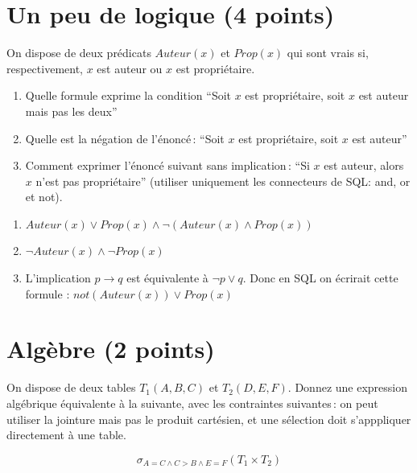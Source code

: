 \section{Un peu de logique (4 points)}

On dispose de deux prédicats $Auteur(x)$ et $Prop(x)$ qui sont vrais si,
respectivement, $x$ est auteur ou $x$ est propriétaire.

\begin{enumerate}
  \item Quelle formule exprime la condition ``Soit $x$  est propriétaire, soit $x$ est auteur mais pas les deux''

  \item Quelle est la négation de l'énoncé\,: ``Soit $x$ est propriétaire, soit $x$ est auteur''

  \item Comment exprimer l'énoncé suivant sans implication\,: ``Si $x$ est auteur, alors $x$ n'est pas propriétaire''
     (utiliser uniquement les connecteurs de SQL: and, or et not).

\end{enumerate}

\begin{solution}

\begin{enumerate}
  \item $Auteur(x) \lor Prop(x) \land \neg (Auteur(x) \land Prop(x))$

  \item $\neg Auteur(x) \land \neg Prop(x)$

  \item L'implication $p \to q$ est équivalente à $\neg p \lor q$.
       Donc en SQL on écrirait cette formule : $not(Auteur(x)) \lor Prop(x)$

\end{enumerate}


\end{solution}


\section{Algèbre (2 points)}
On dispose de deux tables $T_1(A,B,C)$ et $T_2(D,E,F)$. Donnez une  expression algébrique équivalente
à la suivante, avec les contraintes suivantes\,: on peut utiliser  la jointure mais pas le  produit cartésien, et
une sélection doit s'apppliquer directement à une table.

$$\sigma_{A=C \land C > B \land E =F} (T_1 \times T_2)$$

